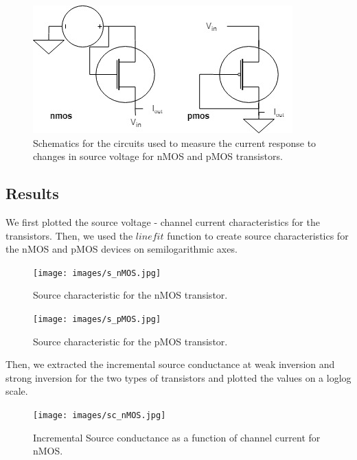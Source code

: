 \documentclass{article}
\begin{document}
\begin{figure}[H]   
\begin{center}
  \includegraphics[scale = 0.5]{images/exp2_schematic.jpg}
  \caption{Schematics for the circuits used to measure the current response to changes in source voltage for nMOS and pMOS transistors.}   
  \label{fig:exp2_sch}
  \end{center}

\end{figure}

\subsection{Results}
We first plotted the source voltage - channel current characteristics for the transistors. Then, we used the $linefit$ function to create source characteristics for the nMOS and pMOS devices on semilogarithmic axes.  
\begin{figure}[H]   
  \begin{center}       
  \texttt{[image: images/s\_nMOS.jpg]}
  \caption{Source characteristic for the nMOS transistor.}   
  \label{fig:sp}
  \end{center}
\end{figure}

\begin{figure}[H]   
  \begin{center}       
  \texttt{[image: images/s\_pMOS.jpg]}
  \caption{Source characteristic for the pMOS transistor.}   
  \label{fig:np}
  \end{center}
\end{figure}

Then, we extracted the incremental source conductance at weak inversion and strong inversion for the two types of transistors and plotted the values on a loglog scale.

\begin{figure}[H]   
  \begin{center}       
  \texttt{[image: images/sc\_nMOS.jpg]}
  \caption{Incremental Source conductance as a function of channel current for nMOS.}   
  \label{fig:n_sc}
  \end{center}
\end{figure}
\end{document}
